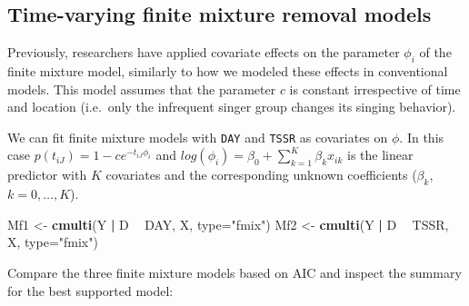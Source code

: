 \documentclass[12pt,]{book}
\newenvironment{Shaded}{\begin{snugshade}}{\end{snugshade}}
\newcommand{\DataTypeTok}[1]{\textcolor[rgb]{0.13,0.29,0.53}{#1}}
\newcommand{\DecValTok}[1]{\textcolor[rgb]{0.00,0.00,0.81}{#1}}
\newcommand{\KeywordTok}[1]{\textcolor[rgb]{0.13,0.29,0.53}{\textbf{#1}}}
\newcommand{\NormalTok}[1]{#1}
\newcommand{\OperatorTok}[1]{\textcolor[rgb]{0.81,0.36,0.00}{\textbf{#1}}}
\newcommand{\StringTok}[1]{\textcolor[rgb]{0.31,0.60,0.02}{#1}}
\begin{document}
\hypertarget{time-varying-finite-mixture-removal-models}{%
\subsection{Time-varying finite mixture removal models}\label{time-varying-finite-mixture-removal-models}}

Previously, researchers have applied covariate effects on the parameter
\(\phi_{i}\) of the finite mixture model, similarly to how we modeled these effects in conventional models.
This model assumes that the parameter \(c\) is constant irrespective of time and location
(i.e.~only the infrequent singer group changes its singing behavior).

We can fit finite mixture models with \texttt{DAY} and \texttt{TSSR} as covariates on \(\phi\).
In this case \(p(t_{iJ}) = 1 - c e^{-t_{iJ} \phi_{i}}\) and
\(log(\phi_{i}) = \beta_{0} + \sum^{K}_{k=1} \beta_{k} x_{ik}\)
is the linear predictor with \(K\) covariates and the corresponding unknown coefficients
(\(\beta_{k}\), \(k = 0,\ldots, K\)).

\begin{Shaded}
\begin{Highlighting}[]
\NormalTok{Mf1 <-}\StringTok{ }\KeywordTok{cmulti}\NormalTok{(Y }\OperatorTok{|}\StringTok{ }\NormalTok{D }\OperatorTok{~}\StringTok{ }\NormalTok{DAY, X, }\DataTypeTok{type=}\StringTok{"fmix"}\NormalTok{)}
\NormalTok{Mf2 <-}\StringTok{ }\KeywordTok{cmulti}\NormalTok{(Y }\OperatorTok{|}\StringTok{ }\NormalTok{D }\OperatorTok{~}\StringTok{ }\NormalTok{TSSR, X, }\DataTypeTok{type=}\StringTok{"fmix"}\NormalTok{)}
\end{Highlighting}
\end{Shaded}

Compare the three finite mixture models based on AIC and inspect the summary for the best supported
model:

\begin{Shaded}
\end{Shaded}
\end{document}
